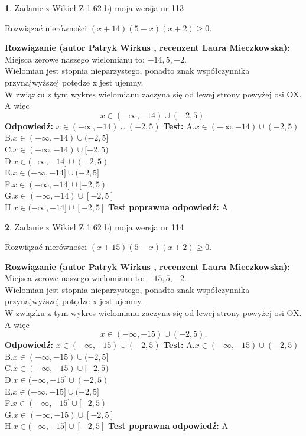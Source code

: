 \documentclass[12pt, a4paper]{article}
\theoremstyle{definition} %
\newtheorem{zad}{}
\newcommand{\zadStart}[1]{\begin{zad}#1\newline}
\newcommand{\zadStop}{\end{zad}}
\newcommand{\rozwStart}[2]{\noindent \textbf{Rozwiązanie (autor #1 , recenzent #2): }\newline}
\newcommand{\rozwStop}{\newline}
\newcommand{\odpStart}{\noindent \textbf{Odpowiedź:}\newline}
\newcommand{\odpStop}{\newline}
\newcommand{\testStart}{\noindent \textbf{Test:}\newline}
\newcommand{\testStop}{\newline}
\newcommand{\kluczStart}{\noindent \textbf{Test poprawna odpowiedź:}\newline}
\newcommand{\kluczStop}{\newline}
\begin{document}
\zadStart{Zadanie z Wikieł Z 1.62 b) moja wersja nr 113}

Rozwiązać nierówności $(x+14)(5-x)(x+2)\ge0$.
\zadStop
\rozwStart{Patryk Wirkus}{Laura Mieczkowska}
Miejsca zerowe naszego wielomianu to: $-14, 5, -2$.\\
Wielomian jest stopnia nieparzystego, ponadto znak współczynnika przy\linebreak najwyższej potędze x jest ujemny.\\ W związku z tym wykres wielomianu zaczyna się od lewej strony powyżej osi OX. A więc $$x \in (-\infty,-14) \cup (-2,5).$$
\rozwStop
\odpStart
$x \in (-\infty,-14) \cup (-2,5)$
\odpStop
\testStart
A.$x \in (-\infty,-14) \cup (-2,5)$\\
B.$x \in (-\infty,-14) \cup (-2,5]$\\
C.$x \in (-\infty,-14) \cup [-2,5)$\\
D.$x \in (-\infty,-14] \cup (-2,5)$\\
E.$x \in (-\infty,-14] \cup (-2,5]$\\
F.$x \in (-\infty,-14] \cup [-2,5)$\\
G.$x \in (-\infty,-14) \cup [-2,5]$\\
H.$x \in (-\infty,-14] \cup [-2,5]$
\testStop
\kluczStart
A
\kluczStop



\zadStart{Zadanie z Wikieł Z 1.62 b) moja wersja nr 114}

Rozwiązać nierówności $(x+15)(5-x)(x+2)\ge0$.
\zadStop
\rozwStart{Patryk Wirkus}{Laura Mieczkowska}
Miejsca zerowe naszego wielomianu to: $-15, 5, -2$.\\
Wielomian jest stopnia nieparzystego, ponadto znak współczynnika przy\linebreak najwyższej potędze x jest ujemny.\\ W związku z tym wykres wielomianu zaczyna się od lewej strony powyżej osi OX. A więc $$x \in (-\infty,-15) \cup (-2,5).$$
\rozwStop
\odpStart
$x \in (-\infty,-15) \cup (-2,5)$
\odpStop
\testStart
A.$x \in (-\infty,-15) \cup (-2,5)$\\
B.$x \in (-\infty,-15) \cup (-2,5]$\\
C.$x \in (-\infty,-15) \cup [-2,5)$\\
D.$x \in (-\infty,-15] \cup (-2,5)$\\
E.$x \in (-\infty,-15] \cup (-2,5]$\\
F.$x \in (-\infty,-15] \cup [-2,5)$\\
G.$x \in (-\infty,-15) \cup [-2,5]$\\
H.$x \in (-\infty,-15] \cup [-2,5]$
\testStop
\kluczStart
A
\kluczStop
\end{document}
